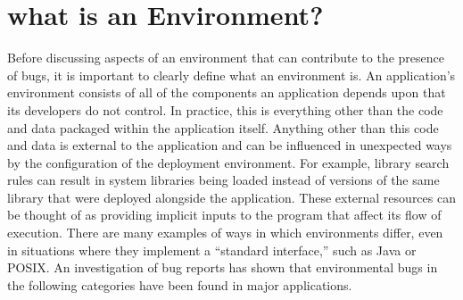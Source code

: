 \section{what is an Environment?}
\label{SEC:background}

Before discussing aspects of an environment that can contribute to the
presence of bugs, it is important to clearly
define what an environment is.
An application's environment consists of
all of the
components an application depends upon that its developers do not control.
In practice, this is everything other than the code and data packaged
within the application itself.  Anything other than this code and data is
external to the application and can be
influenced in unexpected ways by the configuration of the
deployment environment.
For example, library search rules can result in system libraries being
loaded instead of versions of the same library that were
deployed alongside the
application.
These external resources can be thought of as
providing implicit inputs to the program that affect its flow of execution.
There are many examples of ways in which environments differ, even in
situations where they implement a ``standard interface,'' such as Java or
POSIX.
An investigation of bug reports has shown that environmental bugs in the
following categories have been found in major applications.


